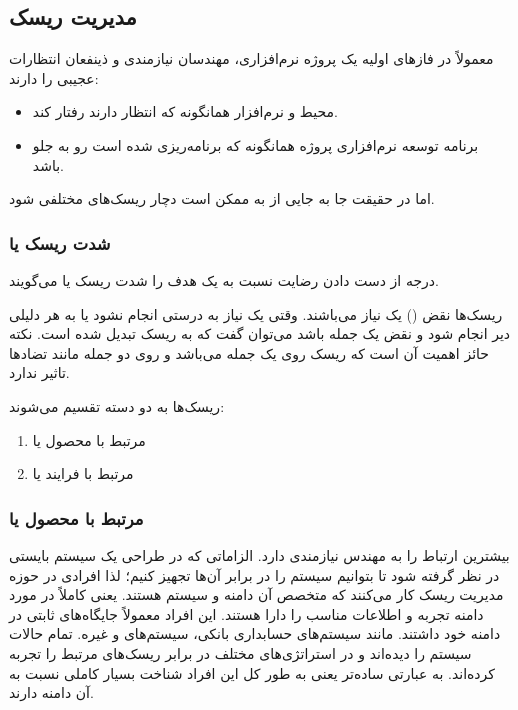 \subsection{مدیریت ریسک}

معمولاً در فاز‌های اولیه یک پروژه نرم‌افزاری، مهندسان نیازمندی و ذینفعان
انتظارات عجیبی را دارند:

\begin{itemize}
    \item محیط و نرم‌افزار همانگونه که انتظار دارند رفتار کند.
    \item برنامه توسعه نرم‌افزاری پروژه همانگونه که برنامه‌ریزی شده است رو به جلو
    باشد.
\end{itemize}

اما در حقیقت جا به جایی از  به  ممکن است دچار
ریسک‌های مختلفی شود.

\subsubsection{شدت ریسک یا }

درجه از دست دادن رضایت نسبت به یک هدف را شدت ریسک یا  می‌گویند.

ریسک‌ها نقض () یک نیاز می‌باشند. وقتی یک نیاز به درستی انجام نشود یا به
هر دلیلی دیر انجام شود و نقض یک جمله باشد می‌توان گفت که به ریسک تبدیل شده است.
نکته حائز اهمیت آن است که ریسک روی یک جمله می‌باشد و روی دو جمله مانند تضاد‌ها
تاثیر ندارد.

ریسک‌ها به دو دسته تقسیم می‌شوند:

\begin{enumerate}
    \item مرتبط با محصول یا 
    \item مرتبط با فرایند یا 
\end{enumerate}

\subsubsection{مرتبط با محصول یا }

بیشترین ارتباط را به مهندس نیازمندی دارد. الزاماتی که در طراحی یک سیستم بایستی
در نظر گرفته شود تا بتوانیم سیستم را در برابر آن‌ها تجهیز کنیم؛ لذا افرادی در
حوزه مدیریت ریسک کار می‌کنند که متخصص آن دامنه و سیستم هستند. یعنی کاملاً در
مورد دامنه تجربه و اطلاعات مناسب را دارا هستند. این افراد معمولاً جایگاه‌های
ثابتی در دامنه خود داشتند. مانند سیستم‌های حسابداری بانکی، سیستم‌های  و
غیره. تمام حالات سیستم را دیده‌اند و در استراتژی‌های مختلف در برابر ریسک‌های
مرتبط را تجربه کرده‌اند. به عبارتی ساده‌تر یعنی به طور کل این افراد شناخت بسیار
کاملی نسبت به آن دامنه دارند.

